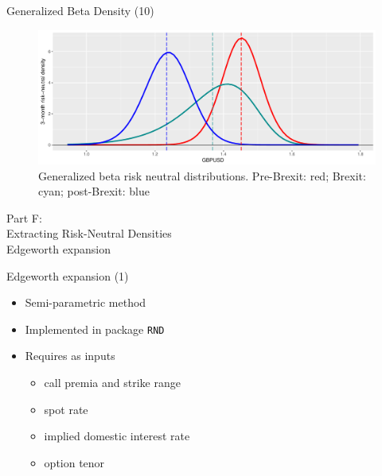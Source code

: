 \documentclass[ignorenonframetext,aspectratio=169]{beamer}
\providecommand{\tightlist}{%
  \setlength{\itemsep}{0pt}\setlength{\parskip}{0pt}}
\begin{document}
\begin{frame}{Generalized Beta Density (10)}

\begin{figure}
\includegraphics[width=1\linewidth]{2018_02_07_IMF_FXCourse_files/figure-beamer/unnamed-chunk-58-1} \caption{Generalized beta risk neutral distributions. Pre-Brexit: red; Brexit: cyan; post-Brexit: blue}\label{fig:unnamed-chunk-58}
\end{figure}

\end{frame}

\begin{frame}{}

\color{blue} \LARGE{Part F:}\\
\LARGE{Extracting Risk-Neutral Densities}\\
\Large{Edgeworth expansion}

\end{frame}

\begin{frame}[fragile]{Edgeworth expansion (1)}

\begin{itemize}
\tightlist
\item
  Semi-parametric method
\item
  Implemented in package \texttt{RND}
\item
  Requires as inputs

  \begin{itemize}
  \tightlist
  \item
    call premia and strike range
  \item
    spot rate
  \item
    implied domestic interest rate
  \item
    option tenor
  \end{itemize}
\end{itemize}

\end{frame}
\end{document}
